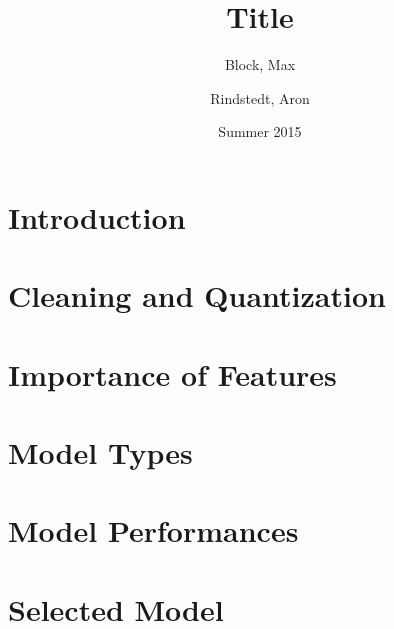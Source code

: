 \documentclass[12pt,a4paper]{article}
\title{Title}
\author{Block, Max \and Rindstedt, Aron}
\date{Summer 2015}
\begin{document}
\maketitle
\thispagestyle{empty}
\tableofcontents
\eject
\section{Introduction}


\section{Cleaning and Quantization}


\section{Importance of Features}


\section{Model Types}


\section{Model Performances}


\section{Selected Model}

\end{document}
